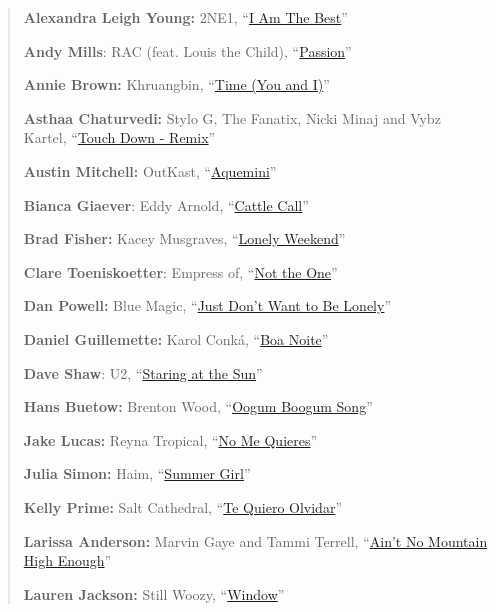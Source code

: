 \begin{quote}
\textbf{Alexandra Leigh Young:} 2NE1,
``\href{https://www.youtube.com/watch?v=j7_lSP8Vc3o}{I Am The Best}''

\textbf{Andy Mills}: RAC (feat. Louis the Child),
``\href{https://www.youtube.com/watch?v=csKxedk-KpA}{Passion}''

\textbf{Annie Brown:} Khruangbin,
``\href{https://www.youtube.com/watch?v=oc50wHexbwg}{Time (You and I)}''

\textbf{Asthaa Chaturvedi:} Stylo G, The Fanatix, Nicki Minaj and Vybz
Kartel, ``\href{https://www.youtube.com/watch?v=459bLvt7f9c}{Touch Down
- Remix}''

\textbf{Austin Mitchell:} OutKast,
``\href{https://www.youtube.com/watch?v=M4fwLA1_ARM}{Aquemini}''

\textbf{Bianca Giaever}: Eddy Arnold,
``\href{https://www.youtube.com/watch?v=_-UFTpiqUts}{Cattle Call}''

\textbf{Brad Fisher:} Kacey Musgraves,
``\href{https://www.youtube.com/watch?v=Zr3gscRpAhA}{Lonely Weekend}''

\textbf{Clare Toeniskoetter}: Empress of,
``\href{https://www.youtube.com/watch?v=ln3jvZ5B9o8}{Not the One}''

\textbf{Dan Powell:} Blue Magic,
``\href{https://www.youtube.com/watch?v=bEL7b9zTZHE}{Just Don't Want to
Be Lonely}''

\textbf{Daniel Guillemette:} Karol Conká,
``\href{https://www.youtube.com/watch?v=hU3soPwOLDI}{Boa Noite}''

\textbf{Dave Shaw}: U2,
``\href{https://www.youtube.com/watch?v=q4Gr8Lf2Bzo}{Staring at the
Sun}''

\textbf{Hans Buetow:} Brenton Wood,
``\href{https://www.youtube.com/watch?v=JbZ413-78ok}{Oogum Boogum
Song}''

\textbf{Jake Lucas:} Reyna Tropical,
``\href{https://www.youtube.com/watch?v=FX1fFjh0h8U}{No Me Quieres}''

\textbf{Julia Simon:} Haim,
``\href{https://www.youtube.com/watch?v=ZjuA_o6Jzyo}{Summer Girl}''

\textbf{Kelly Prime:} Salt Cathedral,
``\href{https://www.youtube.com/watch?v=hcCbKwi5fdE}{Te Quiero
Olvidar}''

\textbf{Larissa Anderson:} Marvin Gaye and Tammi Terrell,
``\href{https://www.youtube.com/watch?v=-C_3eYj-pOM}{Ain't No Mountain
High Enough}''

\textbf{Lauren Jackson:} Still Woozy,
``\href{https://www.youtube.com/watch?v=tiXfzapc2Js}{Window}''


\end{quote}
